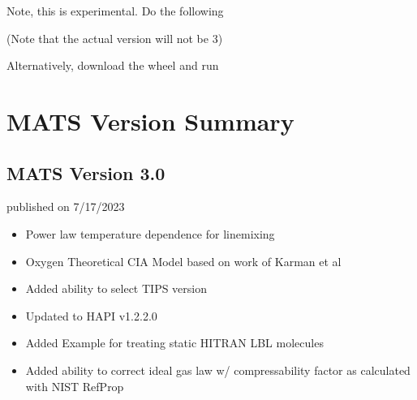 \documentclass[letterpaper,10pt,english]{sphinxmanual}
\begin{document}
\sphinxAtStartPar
{}
Note, this is experimental.  Do the following

\begin{sphinxVerbatim}[commandchars=\\\{\}]
  
\end{sphinxVerbatim}

\sphinxAtStartPar
(Note that the actual version will not be 3)

\sphinxAtStartPar
Alternatively, download the wheel and run

\begin{sphinxVerbatim}[commandchars=\\\{\}]
  
\end{sphinxVerbatim}

\sphinxstepscope


\section{MATS Version Summary}
\label{\detokenize{MATS Version Summary:mats-version-summary}}\label{\detokenize{MATS Version Summary::doc}}

\subsection{MATS Version 3.0}
\label{\detokenize{MATS Version Summary:mats-version-3-0}}
\sphinxAtStartPar
published on 7/17/2023

\sphinxAtStartPar
{}
\begin{itemize}
\item {} 
\sphinxAtStartPar
Power law temperature dependence for line\sphinxhyphen{}mixing

\item {} 
\sphinxAtStartPar
Oxygen Theoretical CIA Model based on work of Karman et al

\item {} 
\sphinxAtStartPar
Added ability to select TIPS version

\item {} 
\sphinxAtStartPar
Updated to HAPI v1.2.2.0

\item {} 
\sphinxAtStartPar
Added Example for treating static HITRAN LBL molecules

\item {} 
\sphinxAtStartPar
Added ability to correct ideal gas law w/ compressability factor as calculated with NIST RefProp

\end{itemize}
\end{document}
